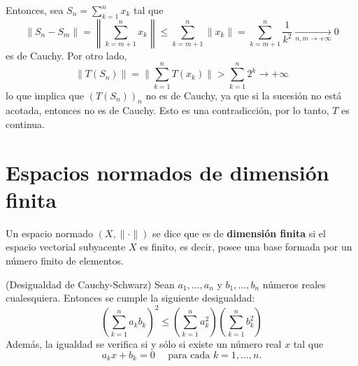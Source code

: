 \begin{ejercicio}
\begin{description}
\begin{itemize}
        \end{itemize}
        Entonces, sea $S_n = \sum\limits_{k=1}^{n} x_k$ tal que 
        $$\|S_n -S_m\|= \left\| \sum\limits_{k=m+1}^{n} x_k \right\|\leq \sum\limits_{k=m+1}^{n} \|x_k\| = \sum\limits_{k=m+1}^{n} \dfrac{1}{k^2} \xrightarrow[n,m \to +\infty]{} 0$$
        es de Cauchy. Por otro lado, 
        $$\|T(S_n)\| = \|\sum_{k=1}^{n} T(x_k)\| > \sum_{k=1}^{n} 2^k \to +\infty$$
        lo que implica que $(T(S_n))_n$ no es de Cauchy, ya que si la sucesión no está acotada, entonces no es de Cauchy. Esto es una contradicción, por lo tanto, $T$ es continua. \\
    \end{description}
\end{ejercicio}


\section{Espacios normados de dimensión finita}

\begin{definicion}
    Un espacio normado $(X, \|\cdot\|)$ se dice que es de \textbf{dimensión finita} si el espacio vectorial subyacente $X$ es finito, es decir, posee una base formada por un número finito de elementos.
\end{definicion}

\begin{prop}(Desigualdad de Cauchy-Schwarz)
    Sean $a_1, \dots, a_n$ y $b_1, \dots, b_n$ números reales cualesquiera. Entonces se cumple la siguiente desigualdad:
    \begin{equation*}
        \left( \sum_{k=1}^n a_k b_k \right)^2 \leq \left( \sum_{k=1}^n a_k^2 \right) \left( \sum_{k=1}^n b_k^2 \right)
    \end{equation*}
    Además, la igualdad se verifica si y sólo si existe un número real $x$ tal que
    \begin{equation*}
        a_k x + b_k = 0 \quad \text{ para cada } k = 1, \dots, n.
    \end{equation*}
\end{prop}

